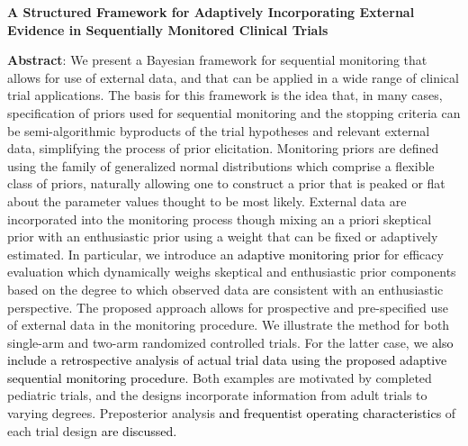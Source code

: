 \documentclass[12pt]{article}
\begin{document}
	\begin{center}
		\textbf{A Structured Framework for Adaptively Incorporating External\\ 
		         Evidence in Sequentially Monitored Clinical Trials} %
%
%
%
	\end{center}


\vspace{1.5cm}
\noindent
\textbf{Abstract}:
{We present a Bayesian framework for sequential monitoring that allows for use of external data, and that 
can be applied in a wide range of clinical trial applications. The basis for this framework is the 
idea that, in many cases, specification of priors used for sequential monitoring and the stopping criteria can be semi-algorithmic byproducts of the trial hypotheses and relevant external data, simplifying the process of prior elicitation. Monitoring priors are defined using the family of generalized normal distributions which comprise a flexible class of priors, naturally allowing one to construct a prior that is peaked or flat about the parameter values thought to be most likely. External data are incorporated into the monitoring process though mixing an a priori skeptical prior with an enthusiastic prior using a weight that can be fixed or adaptively estimated. In particular, we introduce an \textcolor{black}{adaptive monitoring prior} for efficacy evaluation which dynamically weighs skeptical and enthusiastic prior components based on the degree to which observed data \textcolor{black}{are} consistent with an enthusiastic perspective. The proposed approach allows for prospective and pre-specified use of external data in the monitoring procedure.
%
We illustrate the method for both single-arm and two-arm randomized controlled trials. For the latter case, we \textcolor{black}{also include a retrospective analysis of actual trial data using the proposed adaptive sequential monitoring procedure}. Both examples are motivated by completed pediatric trials, and the designs incorporate information from adult trials to varying degrees. Preposterior analysis \textcolor{black}{and frequentist operating characteristics} of each trial design \textcolor{black}{are discussed.}}
\end{document}
